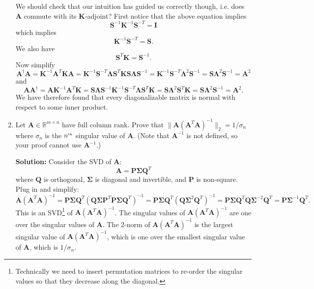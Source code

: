\documentclass[11pt,fleqn]{article}
\newcommand{\mat}[1]{\mathbf{#1}}
\begin{document}
\begin{enumerate}
We should check that our intuition has guided us correctly though, i.e. does {\bf A} commute with its {\bf K}-adjoint?
First notice that the above equation implies
\[\mathbf{S}^{-1}\mathbf{K}^{-1}\mathbf{S}^{-T} = \mathbf{I}\]
which implies
\[\mathbf{K}^{-1}\mathbf{S}^{-T} = \mathbf{S}.\]
We also have
\[\mathbf{S}^T\mathbf{K} = \mathbf{S}^{-1}.\]
Now simplify
\[\mathbf{A}^\dag \mathbf{A} = \mathbf{K}^{-1}\mathbf{A}^T\mathbf{K}\mathbf{A} = \mathbf{K}^{-1}\mathbf{S}^{-T}\mathbf{\Lambda S}^T\mathbf{KS\Lambda S}^{-1}=\mathbf{K}^{-1}\mathbf{S}^{-T}\mathbf{\Lambda}^2\mathbf{S}^{-1} = \mathbf{S\Lambda}^2\mathbf{S}^{-1} = \mathbf{A}^2\]
and
\[\mathbf{AA}^\dag = \mathbf{A}\mathbf{K}^{-1}\mathbf{A}^T\mathbf{K}=\mathbf{S\Lambda S}^{-1}\mathbf{K}^{-1}\mathbf{S}^{-T}\mathbf{\Lambda S}^T\mathbf{K}=\mathbf{S\Lambda}^2\mathbf{S}^T\mathbf{K} = \mathbf{S\Lambda}^2\mathbf{S}^{-1} = \mathbf{A}^2.\]
We have therefore found that every diagonalizable matrix is normal with respect to some inner product.\\

\item Let $\mat{A}\in\mathbb{R}^{m\times n}$ have full column rank. Prove that $\|\mat{A}(\mat{A}^T\mat{A})^{-1}\|_2=1/\sigma_n$ where $\sigma_n$ is the $n^{\mbox{\tiny th}}$ singular value of $\mat{A}$. (Note that $\mat{A}^{-1}$ is not defined, so your proof cannot use $\mat{A}^{-1}$.)

{\bf Solution:} Consider the SVD of {\bf A}:
\[\mathbf{A} = \mathbf{P\Sigma Q}^T\]
where $\mathbf{Q}$ is orthogonal, $\mathbf{\Sigma}$ is diagonal and invertible, and $\mathbf{P}$ is non-square.
Plug in and simplify:
\[\mat{A}(\mat{A}^T\mat{A})^{-1}=\mathbf{P\Sigma Q}^T(\mathbf{Q\Sigma P}^T\mathbf{P\Sigma Q}^T)^{-1} = \mathbf{P\Sigma Q}^T(\mathbf{Q\Sigma}^2\mathbf{Q}^T)^{-1}=\mathbf{P\Sigma Q}^T\mathbf{Q\Sigma}^{-2}\mathbf{Q}^T=\mathbf{P\Sigma}^{-1}\mathbf{Q}^T.\]
This is an SVD\footnote{Technically we need to insert permutation matrices to re-order the singular values so that they decrease along the diagonal.} of $\mat{A}(\mat{A}^T\mat{A})^{-1}$. The singular values of $\mat{A}(\mat{A}^T\mat{A})^{-1}$ are one over the singular values of $\mathbf{A}$.
The 2-norm of $\mat{A}(\mat{A}^T\mat{A})^{-1}$ is the largest singular value of $\mat{A}(\mat{A}^T\mat{A})^{-1}$, which is one over the smallest singular value of $\mathbf{A}$, which is $1/\sigma_n$.

\end{enumerate}
 
\end{document}
